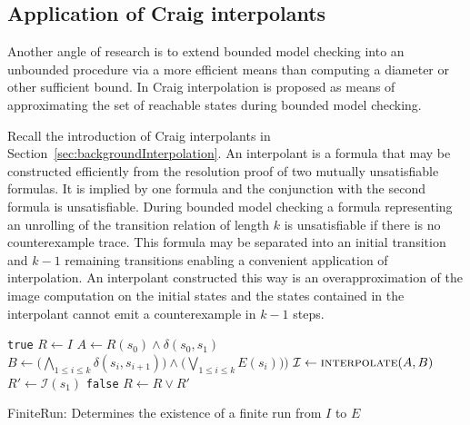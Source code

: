 \subsection{Application of Craig interpolants}

Another angle of research is to extend bounded model checking into an unbounded procedure via a more efficient means than computing a diameter or other sufficient bound. In \cite{McMillan03} Craig interpolation is proposed as means of approximating the set of reachable states during bounded model checking. 

Recall the introduction of Craig interpolants in Section~\ref{sec:backgroundInterpolation}. An interpolant is a formula that may be constructed efficiently from the resolution proof of two mutually unsatisfiable formulas. It is implied by one formula and the conjunction with the second formula is unsatisfiable. During bounded model checking a formula representing an unrolling of the transition relation of length $k$ is unsatisfiable if there is no counterexample trace. This formula may be separated into an initial transition and $k-1$ remaining transitions enabling a convenient application of interpolation. An interpolant constructed this way is an overapproximation of the image computation on the initial states and the states contained in the interpolant cannot emit a counterexample in $k-1$ steps. 


\begin{algorithm}
    \begin{algorithmic}
             \Return \texttt{true} \EndIIf
            \State $R \gets I$
            \Loop
                \State $A \gets R(s_0) \land \delta(s_0, s_1)$
                \State $B \gets \big( \bigwedge_{1 \leq i \leq k} \delta(s_i, s_{i+1}) \big) \land \big( \bigvee_{1 \leq i \leq k}E(s_i) \big) \big)$
                \label{line:interpSatCheck}
                \State {} \EndIfElse
                \Else
                    \State $\mathcal{I} \gets \Call{interpolate}{A, B}$
                    \State $R' \gets \mathcal{I}(s_1)$
                     \Return \texttt{false} \EndIIf
                    \State $R \gets R \lor R'$
                \EndIf
            \EndLoop
        \EndFunction
    \end{algorithmic}
    \caption{FiniteRun: Determines the existence of a finite run from $I$ to $E$}
    \label{alg:interpolation}
\end{algorithm}

